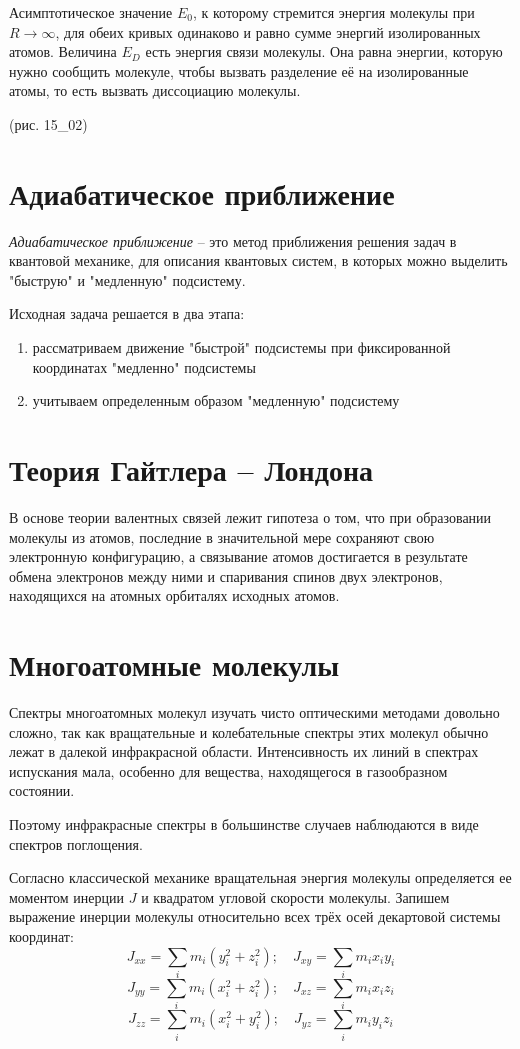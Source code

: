 Асимптотическое значение \( E_0 \), к которому стремится энергия 
молекулы при \( R \rightarrow \infty \), для обеих кривых одинаково 
и равно сумме энергий изолированных атомов. Величина \( E_D \) есть 
энергия связи молекулы. Она равна энергии, которую нужно сообщить 
молекуле, чтобы вызвать разделение её на изолированные атомы, то есть 
вызвать диссоциацию молекулы.

(рис. 15\_02)

\section{Адиабатическое приближение}
\emph{Адиабатическое приближение} -- это метод приближения решения задач в 
квантовой механике, для описания квантовых систем, в которых можно выделить 
"быструю" и "медленную" подсистему. 

Исходная задача решается в два этапа:
\begin{enumerate}
    \item рассматриваем движение "быстрой" подсистемы при фиксированной 
        координатах "медленно" подсистемы
    \item учитываем определенным образом "медленную" подсистему
\end{enumerate}

\section{Теория Гайтлера -- Лондона}
В основе теории валентных связей лежит гипотеза о том, что при 
образовании молекулы из атомов, последние в значительной мере сохраняют 
свою электронную конфигурацию, а связывание атомов достигается в 
результате обмена электронов между ними и спаривания спинов двух 
электронов, находящихся на атомных орбиталях исходных атомов. 

\section{Многоатомные молекулы}
Спектры многоатомных молекул изучать чисто оптическими методами
довольно сложно, так как вращательные и колебательные спектры этих
молекул обычно лежат в далекой инфракрасной области. Интенсивность их
линий в спектрах испускания мала, особенно для вещества, находящегося в
газообразном состоянии.

Поэтому инфракрасные спектры в большинстве случаев наблюдаются в
виде спектров поглощения.

Согласно классической механике вращательная энергия молекулы
определяется ее моментом инерции \( J \) и квадратом угловой скорости
молекулы. Запишем выражение инерции молекулы относительно всех трёх 
осей декартовой системы координат:
\[ 
	J_{xx} = \sum_i m_i\left( y^2_i + z^2_i \right);\quad
	J_{xy} = \sum_i m_i x_i y_i
\]
\[ 
	J_{yy} = \sum_i m_i\left( x^2_i + z^2_i \right);\quad
	J_{xz} = \sum_i m_i x_i z_i
\]
\[ 
	J_{zz} = \sum_i m_i\left( x^2_i + y^2_i \right);\quad
	J_{yz} = \sum_i m_i y_i z_i
\]

